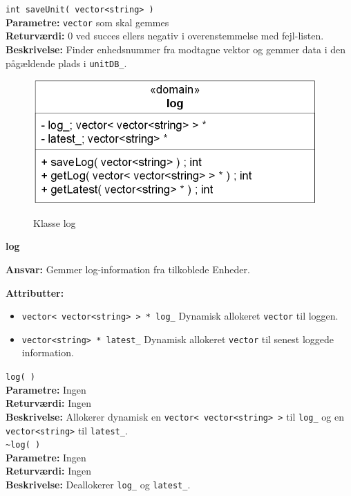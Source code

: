 \verb+int saveUnit( vector<string> ) +\\
\textbf{Parametre:} \verb+vector+ som skal gemmes \\
\textbf{Returværdi:} 0 ved succes ellers negativ i overenstemmelse med fejl-listen. \\
\textbf{Beskrivelse:} Finder enhedsnummer fra modtagne vektor og gemmer data i den pågældende plads i \verb+unitDB_+. \\

\begin{figure}[htbp] \centering
{\includegraphics[scale=1.5]{filer/design/Klassediagrammer/sw_log}}
\caption{Klasse log}
\label{fig:log klassediagram}
\end{figure} 

{\centering
\textbf{log}\par
}
\textbf{Ansvar:} Gemmer log-information fra tilkoblede Enheder. \

\textbf{Attributter:}
\begin{itemize}
	\item \verb+vector< vector<string> > * log_+ Dynamisk allokeret \verb+vector+ til loggen.
	\item \verb+vector<string> * latest_+ Dynamisk allokeret \verb+vector+ til senest loggede information.
\end{itemize}

\verb+log( ) +\\
\textbf{Parametre:} Ingen \\
\textbf{Returværdi:} Ingen\\
\textbf{Beskrivelse:} Allokerer dynamisk en \verb+vector< vector<string> >+ til \verb+log_+ og en \verb+vector<string>+ til \verb+latest_+. \\

\verb+~log( ) +\\
\textbf{Parametre:} Ingen \\
\textbf{Returværdi:} Ingen\\
\textbf{Beskrivelse:} Deallokerer \verb+log_+ og \verb+latest_+. \\

